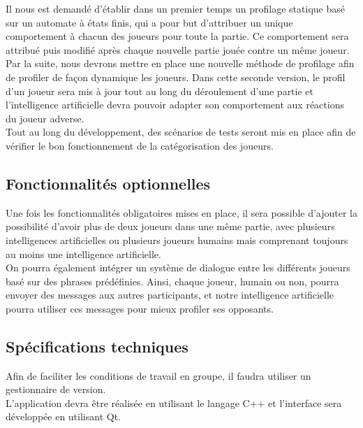 \documentclass{report}
\begin{document}
Il nous est demandé d'établir dans un premier temps un profilage statique basé sur un automate à états finis, qui a pour but d'attribuer un unique comportement à chacun des joueurs pour toute la partie. Ce comportement sera attribué puis modifié après chaque nouvelle partie jouée contre un même joueur.\\

Par la suite, nous devrons mettre en place une nouvelle méthode de profilage afin de profiler de façon dynamique les joueurs. Dans cette seconde version, le profil d'un joueur sera mis à jour tout au long du déroulement d'une partie et l'intelligence artificielle devra pouvoir adapter son comportement aux réactions du joueur adverse.\\

Tout au long du développement, des scénarios de tests seront mis en place afin de vérifier le bon fonctionnement de la catégorisation des joueurs.\par

\subsection{Fonctionnalités optionnelles}

\hspace{0.5cm}Une fois les fonctionnalités obligatoires mises en place, il sera possible d'ajouter la possibilité d'avoir plus de deux joueurs dans une même partie, avec plusieurs intelligences artificielles ou plusieurs joueurs humains mais comprenant toujours au moins une intelligence artificielle.\\

On pourra également intégrer un système de dialogue entre les différents joueurs basé sur des phrases prédéfinies. Ainsi, chaque joueur, humain ou non, pourra envoyer des messages aux autres participants, et notre intelligence artificielle pourra utiliser ces messages pour mieux profiler ses opposants.\par 

\subsection{Spécifications techniques}

\hspace{0.5cm}Afin de faciliter les conditions de travail en groupe, il faudra utiliser un gestionnaire de version.\\

L'application devra être réalisée en utilisant le langage C++ et l'interface sera développée en utilisant Qt.\\
\end{document}
